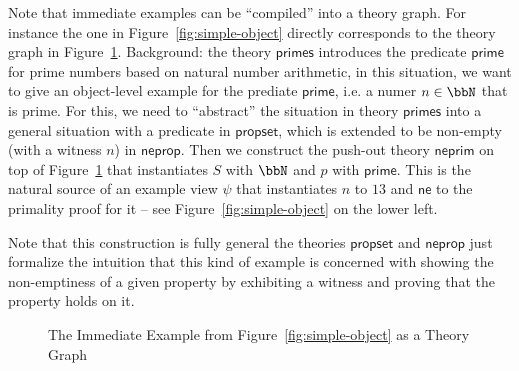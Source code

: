 \documentclass[11pt]{bluenote}
\def\cn#1{\mathsf{#1}}
\begin{document}
Note that immediate examples can be ``compiled'' into a theory graph. For instance the one
in Figure~\ref{fig:simple-object} directly corresponds to the theory graph in
Figure~\ref{fig:so-tg}. Background: the theory $\cn{primes}$ introduces the predicate
$\cn{prime}$ for prime numbers based on natural number arithmetic, in this situation, we
want to give an object-level example for the prediate $\cn{prime}$, i.e. a numer $n\in\bbN$
that is prime. For this, we need to ``abstract'' the situation in theory $\cn{primes}$ into
a general situation with a predicate in $\cn{propset}$, which is extended to be non-empty
(with a witness $n$) in $\cn{neprop}$. Then we construct the push-out theory $\cn{neprim}$
on top of Figure~\ref{fig:so-tg} that instantiates $S$ with $\bbN$ and $p$ with
$\cn{prime}$. This is the natural source of an example view $\psi$ that instantiates $n$ to
$13$ and $\cn{ne}$ to the primality proof for it -- see Figure~\ref{fig:simple-object} on
the lower left.

Note that this construction is fully general the theories $\cn{propset}$ and $\cn{neprop}$
just formalize the intuition that this kind of example is concerned with showing the
non-emptiness of a given property by exhibiting a witness and proving that the property
holds on it.

\begin{figure}[ht]\centering
{}
\caption{The Immediate Example from Figure~\ref{fig:simple-object} as a Theory
  Graph}\label{fig:so-tg}
\end{figure}
\end{document}
